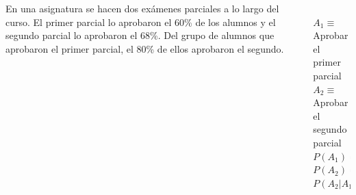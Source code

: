 \documentclass[aspectratio=149,10pt,t]{beamer}
\begin{document}
\begin{frame}
	\begin{columns}
		\begin{column}[T]{0.6\textwidth}
			En una asignatura se hacen dos exámenes parciales a lo largo del curso.
			El primer parcial lo aprobaron el 60\% de los alumnos y el segundo parcial lo aprobaron el 68\%.
			Del grupo de alumnos que aprobaron el primer parcial, el 80\% de ellos aprobaron el segundo.
		\end{column}
		\begin{column}[T]{0.4\textwidth}
			\\
			$A_1 \equiv$ Aprobar el primer parcial\\
			$A_2 \equiv$ Aprobar el segundo parcial\\
			$P(A_1)=0.6$\\
			$P(A_2)=0.68$\\
			$P(A_2|A_1)=0.8$
		\end{column}
	\end{columns}
\end{frame}
\end{document}
